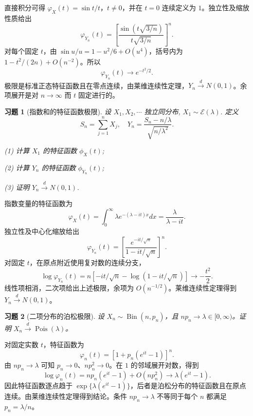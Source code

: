 \documentclass[12pt,fontset=fandol]{ctexart}
\newtheorem{exercise}{习题}[section]
\begin{document}
\begin{solve}\label{a:A6.29}直接积分可得 $\varphi_X(t)=\sin t/t$，$t\ne0$，并在 $t=0$ 连续定义为 $1$。独立性及缩放性质给出\[\varphi_{Y_n}(t)=\left[\frac{\sin(t\sqrt{3/n})}{t\sqrt{3/n}}\right]^n.\]对每个固定 $t$，由 $\sin u/u=1-u^2/6+O(u^4)$，括号内为 $1-t^2/(2n)+O(n^{-2})$。所以\[\varphi_{Y_n}(t)\to e^{-t^2/2}.\]极限是标准正态特征函数且在零点连续，由莱维连续性定理，$Y_n\xrightarrow dN(0,1)$。余项展开是对 $n\to\infty$ 而 $t$ 固定进行的。\end{solve}

\begin{exercise}[指数和的特征函数极限]\label{q:A6.30}
设 $X_1,X_2,\cdots$ 独立同分布, $X_1\sim\mathcal{E}(\lambda)$. 定义
    \[S_n=\sum\limits_{j=1}^nX_j,\quad Y_n=\dfrac{S_n-n/\lambda}{\sqrt{n/\lambda^2}}.\]

    (1) 计算 $X_1$ 的特征函数 $\phi_X(t)$;

    (2) 计算 $Y_n$ 的特征函数 $\phi_{Y_n}(t)$;

    (3) 证明 $Y_n\xrightarrow{d}N(0,1)$.\par{}
\end{exercise}

\begin{solve}\label{a:A6.30}指数变量的特征函数为\[\varphi_X(t)=\int_0^\infty\lambda e^{-(\lambda-it)x}dx=\frac{\lambda}{\lambda-it}.\]独立性及中心化缩放给出\[\varphi_{Y_n}(t)=\left[\frac{e^{-it/\sqrt n}}{1-it/\sqrt n}\right]^n.\]对固定 $t$，在原点附近使用复对数的连续分支，\[\log\varphi_{Y_n}(t)=n[-it/\sqrt n-\log(1-it/\sqrt n)]\to-\frac{t^2}2.\]线性项相消，二次项给出上述极限，余项为 $O(n^{-1/2})$。莱维连续性定理得到 $Y_n\xrightarrow dN(0,1)$。\end{solve}

\begin{exercise}[二项分布的泊松极限]\label{q:A6.34}
设 $X_n\sim\operatorname{Bin}(n,p_n)$，且 $np_n\to\lambda\in[0,\infty)$。证明 $X_n\xrightarrow{d}\operatorname{Pois}(\lambda)$。\par{}
\end{exercise}

\begin{solve}\label{a:A6.34}对固定实数 $t$，特征函数为\[\varphi_n(t)=[1+p_n(e^{it}-1)]^n.\]由 $np_n\to\lambda$ 可知 $p_n\to0$、$np_n^2\to0$。在 $1$ 的邻域展开对数，得到\[\log\varphi_n(t)=np_n(e^{it}-1)+O(np_n^2)\to\lambda(e^{it}-1).\]因此特征函数逐点趋于 $\exp\{\lambda(e^{it}-1)\}$，后者是泊松分布的特征函数且在原点连续。由莱维连续性定理得到结论。条件 $np_n\to\lambda$ 不等同于每个 $n$ 都满足 $p_n=\lambda/n$。\end{solve}
\end{document}

